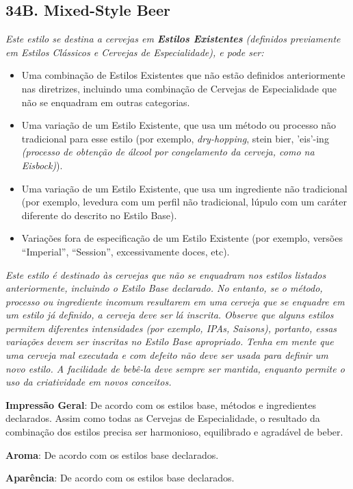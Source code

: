 \subsection*{34B. Mixed-Style Beer}
\textit{Este estilo se destina a cervejas em \textbf{Estilos Existentes} (definidos previamente em Estilos Clássicos e Cervejas de Especialidade), e pode ser:}
\begin{itemize}
  \item Uma combinação de Estilos Existentes que não estão definidos anteriormente nas diretrizes, incluindo uma combinação de Cervejas de Especialidade que não se enquadram em outras categorias.
  \item Uma variação de um Estilo Existente, que usa um método ou processo não tradicional para esse estilo (por exemplo, \textit{dry-hopping}, stein bier, 'eis'-ing \textit{(processo de obtenção de álcool por congelamento da cerveja, como na Eisbock)}).
  \item Uma variação de um Estilo Existente, que usa um ingrediente não tradicional (por exemplo, levedura com um perfil não tradicional, lúpulo com um caráter diferente do descrito no Estilo Base).
  \item Variações fora de especificação de um Estilo Existente (por exemplo, versões “Imperial”, “Session”, excessivamente doces, etc).
\end{itemize}
\textit{Este estilo é destinado às cervejas que não se enquadram nos estilos listados anteriormente, incluindo o Estilo Base declarado. No entanto, se o método, processo ou ingrediente incomum resultarem em uma cerveja que se enquadre em um estilo já definido, a cerveja deve ser lá inscrita. Observe que alguns estilos permitem diferentes intensidades (por exemplo, IPAs, Saisons), portanto, essas variações devem ser inscritas no Estilo Base apropriado.}
\textit{Tenha em mente que uma cerveja mal executada e com defeito não deve ser usada para definir um novo estilo. A facilidade de bebê-la deve sempre ser mantida, enquanto permite o uso da criatividade em novos conceitos.}

\textbf{Impressão Geral}: De acordo com os estilos base, métodos e ingredientes declarados. Assim como todas as Cervejas de Especialidade, o resultado da combinação dos estilos precisa ser harmonioso, equilibrado e agradável de beber.

\textbf{Aroma}: De acordo com os estilos base declarados.

\textbf{Aparência}: De acordo com os estilos base declarados.

